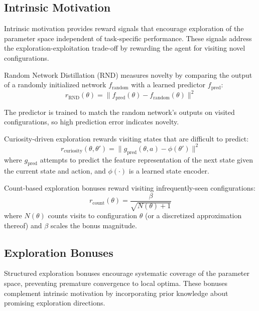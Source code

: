 \subsection{Intrinsic Motivation}

Intrinsic motivation provides reward signals that encourage exploration of the parameter space independent of task-specific performance. These signals address the exploration-exploitation trade-off by rewarding the agent for visiting novel configurations.

Random Network Distillation (RND) measures novelty by comparing the output of a randomly initialized network $f_{\text{random}}$ with a learned predictor $f_{\text{pred}}$:
\begin{equation}
r_{\text{RND}}(\theta) = \|f_{\text{pred}}(\theta) - f_{\text{random}}(\theta)\|^2
\label{eq:rnd_reward}
\end{equation}

The predictor is trained to match the random network's outputs on visited configurations, so high prediction error indicates novelty.

Curiosity-driven exploration rewards visiting states that are difficult to predict:
\begin{equation}
r_{\text{curiosity}}(\theta, \theta') = \|g_{\text{pred}}(\theta, a) - \phi(\theta')\|^2
\label{eq:curiosity_reward}
\end{equation}
where $g_{\text{pred}}$ attempts to predict the feature representation of the next state given the current state and action, and $\phi(\cdot)$ is a learned state encoder.

Count-based exploration bonuses reward visiting infrequently-seen configurations:
\begin{equation}
r_{\text{count}}(\theta) = \frac{\beta}{\sqrt{N(\theta) + 1}}
\label{eq:count_bonus}
\end{equation}
where $N(\theta)$ counts visits to configuration $\theta$ (or a discretized approximation thereof) and $\beta$ scales the bonus magnitude.

\subsection{Exploration Bonuses}

Structured exploration bonuses encourage systematic coverage of the parameter space, preventing premature convergence to local optima. These bonuses complement intrinsic motivation by incorporating prior knowledge about promising exploration directions.

